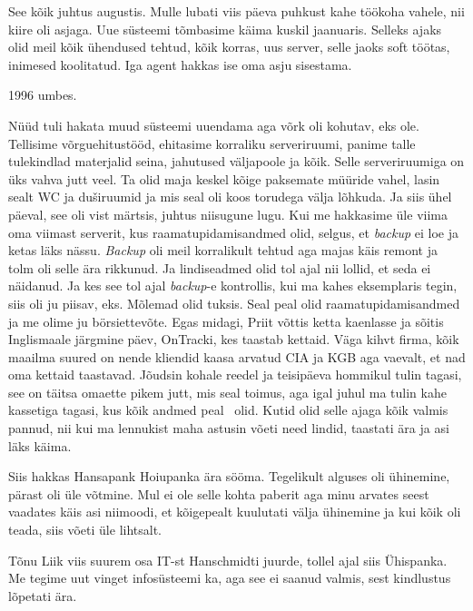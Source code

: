 See kõik juhtus augustis. Mulle lubati viis päeva puhkust kahe töökoha vahele, 
nii kiire oli asjaga. Uue süsteemi tõmbasime käima kuskil jaanuaris. Selleks 
ajaks olid meil kõik ühendused tehtud, kõik korras, uus server, selle jaoks 
soft töötas, inimesed koolitatud. Iga agent hakkas ise oma asju sisestama.


1996 umbes. 

Nüüd tuli hakata muud süsteemi uuendama aga võrk oli kohutav, eks ole. 
Tellisime võrguehitustööd, ehitasime korraliku serveriruumi, panime talle 
tulekindlad materjalid seina, jahutused väljapoole ja kõik. Selle 
serveriruumiga on üks vahva jutt veel. Ta olid maja keskel kõige paksemate 
müüride vahel, lasin sealt WC ja duširuumid ja mis seal oli koos torudega välja 
lõhkuda. Ja siis ühel päeval, see oli vist märtsis, juhtus niisugune lugu. Kui 
me hakkasime üle viima oma  viimast serverit, kus raamatupidamisandmed olid, 
selgus, et \emph{backup} ei loe ja ketas läks nässu. \emph{Backup} oli meil 
korralikult tehtud aga majas käis remont ja tolm oli selle ära rikkunud. Ja 
lindiseadmed olid tol ajal nii lollid, et seda ei näidanud. Ja kes see tol ajal 
\emph{backup}-e kontrollis, kui ma kahes eksemplaris tegin, siis oli ju piisav, 
eks. Mõlemad olid tuksis. Seal peal olid raamatupidamisandmed ja me olime ju 
börsiettevõte. Egas midagi, Priit võttis  ketta kaenlasse ja sõitis Inglismaale 
järgmine päev, OnTracki, kes taastab kettaid. Väga kihvt firma, kõik maailma 
suured on nende kliendid kaasa arvatud CIA ja KGB aga vaevalt, et nad oma 
kettaid taastavad. Jõudsin kohale reedel ja teisipäeva hommikul tulin tagasi, 
see on täitsa omaette pikem jutt, mis seal toimus, aga igal juhul ma tulin kahe 
kassetiga tagasi, kus kõik andmed peal  olid. Kutid olid selle ajaga kõik 
valmis pannud, nii kui ma lennukist maha astusin võeti need lindid, taastati  
ära ja asi läks käima. 

Siis hakkas Hansapank Hoiupanka ära sööma. Tegelikult alguses oli ühinemine, 
pärast oli üle võtmine. Mul ei ole selle kohta paberit aga minu arvates seest 
vaadates käis asi niimoodi, et kõigepealt kuulutati välja ühinemine ja kui kõik 
oli teada, siis võeti üle lihtsalt. 

Tõnu Liik viis suurem osa IT-st 
Hanschmidti juurde, 
tollel ajal siis Ühispanka. Me tegime uut vinget 
infosüsteemi ka, aga see ei saanud valmis, sest kindlustus lõpetati ära. 

